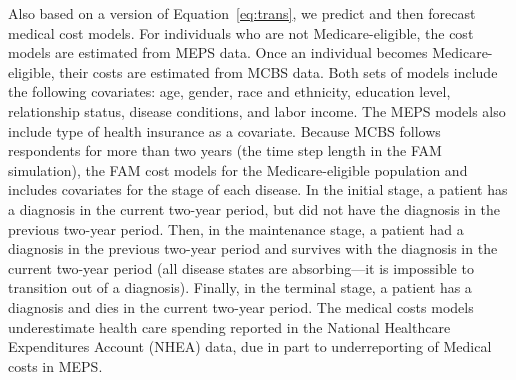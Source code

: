 \noindent Also based on a version of Equation~\eqref{eq:trans}, we predict and then forecast medical cost models. For individuals who are not Medicare-eligible, the cost models are estimated from MEPS data. Once an individual becomes Medicare-eligible, their costs are estimated from MCBS data. Both sets of models include the following covariates: age, gender, race and ethnicity, education level, relationship status, disease conditions, and labor income. The MEPS models also include type of health insurance as a covariate. Because MCBS follows respondents for more than two years (the time step length in the FAM simulation), the FAM cost models for the Medicare-eligible population and includes covariates for the stage of each disease. In the initial stage, a patient has a diagnosis in the current two-year period, but did not have the diagnosis in the previous two-year period. Then, in the maintenance stage, a patient had a diagnosis in the previous two-year period and survives with the diagnosis in the current two-year period (all disease states are absorbing---it is impossible to transition out of a diagnosis). Finally, in the terminal stage, a patient has a diagnosis and dies in the current two-year period. The medical costs models underestimate health care spending reported in the National Healthcare Expenditures Account (NHEA) data, due in part to underreporting of Medical costs in MEPS.
%
